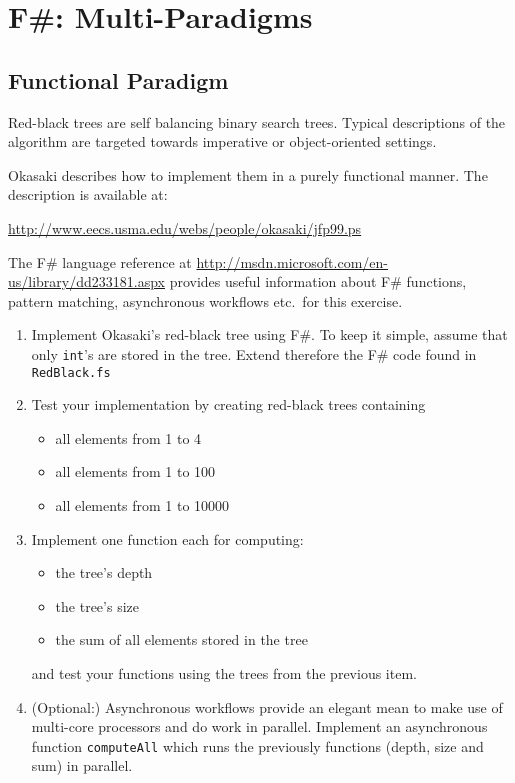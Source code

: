 \documentclass{article}
\begin{document}
\newpage
\section{F\#: Multi-Paradigms}

\subsection{Functional Paradigm}

Red-black trees are self balancing binary search trees. Typical
descriptions of the algorithm are targeted towards imperative or
object-oriented settings. 

Okasaki describes how to implement them in a purely functional
manner. The description is available at:

\url{http://www.eecs.usma.edu/webs/people/okasaki/jfp99.ps}


The F\# language reference at
\url{http://msdn.microsoft.com/en-us/library/dd233181.aspx} provides
useful information about F\# functions, pattern matching, asynchronous
workflows etc.\ for this exercise.


\begin{enumerate}
\item Implement Okasaki's red-black tree using F\#. To keep it
  simple, assume that only \texttt{int}'s are stored in the
  tree. Extend therefore the F\# code found in \texttt{RedBlack.fs}

\item Test your implementation by creating red-black trees containing
  \begin{itemize}
    \item all elements from 1 to 4 
    \item all elements from 1 to 100 
    \item all elements from 1 to 10000
 \end{itemize}

\item Implement one function each for computing:
  \begin{itemize}
    \item the tree's depth
    \item the tree's size
    \item the sum of all elements stored in the tree
  \end{itemize}
  and test your functions using the trees from the previous item.

\item (Optional:) Asynchronous workflows provide an elegant mean to
  make use of multi-core processors and do work in parallel. Implement
  an asynchronous function \texttt{computeAll} which runs the
  previously functions (depth, size and sum) in parallel.
\end{enumerate}
\end{document}
